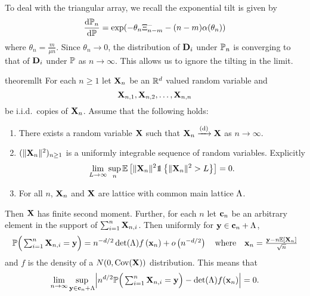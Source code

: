 To deal with the triangular array, we recall the exponential tilt is given by
\begin{equation*}
    \frac{\dif \P_n}{\dif \P} = \exp(
        - \theta_n \Xi^-_{n-m} - (n - m) \alpha(\theta_n)
    )
\end{equation*}
where $\theta_n = \frac{m}{\mu n}$. Since $\theta_n \to 0$, the distribution of $\vD_i$ under $\P_n$ is converging to that of $\vD_i$ under $\P$ as $n \to \infty$. This allows us to ignore the tilting in the limit.

\begin{restatable}{theorem}{llt}
    \label{thm:multi-triangular-llt}
    For each $n \geq 1$ let $\vX_n$ be an $\R^d$ valued random variable and
    \begin{equation*}
        \vX_{n, 1}, \vX_{n, 2}, \ldots, \vX_{n, n}  
    \end{equation*}
    be i.i.d.\ copies of $\vX_n$. Assume that the following holds:
    \begin{enumerate}
        \item There exists a random variable $\vX$ such that $\vX_n \todist \vX$ as $n \to \infty$.
        \item $(\norm{\vX_n}^2)_{n \geq 1}$ is a uniformly integrable sequence of random variables. Explicitly
            \begin{equation}
                \label{eq:ui-condition}
                \lim_{L \to \infty} \sup_n \E\left[
                    \norm{\vX_n}^2
                    \one \left\{ \norm{\vX_n}^2 > L \right\}
                \right] = 0.
            \end{equation}
        \item For all $n$, $\vX_n$ and $\vX$ are lattice with common main lattice $\lattice$.
    \end{enumerate}
    Then $\vX$ has finite second moment. Further, for each $n$ let $\vc_n$ be an arbitrary element in the support of $\sum_{i=1}^n \vX_{n, i}$. Then uniformly for $\vy \in \vc_n + \lattice$,
    \begin{equation*}
        \P\Big(
            \textstyle \sum_{i=1}^n \vX_{n, i} = \vy
        \Big)
        = n^{-d/2} \det(\lattice) f\left( \vx_n \right) + \littleo \left( n^{-d/2} \right)
        \quad \text{where} \quad
        \vx_n = \frac{\vy - n \E[\vX_n]}{\sqrt{n}}
    \end{equation*}
    and $f$ is the density of a $N(0, \cov(\vX))$ distribution. This means that
    \begin{equation*}
        \lim_{n \to \infty} \sup_{\vy \in \vc_n + \lattice} \abs*{
            n^{d/2} \P\Big( \textstyle \sum_{i=1}^n \vX_{n, i} = \vy \Big)
            - \det(\lattice) f(\vx_n)
        } = 0.
    \end{equation*}
\end{restatable}

